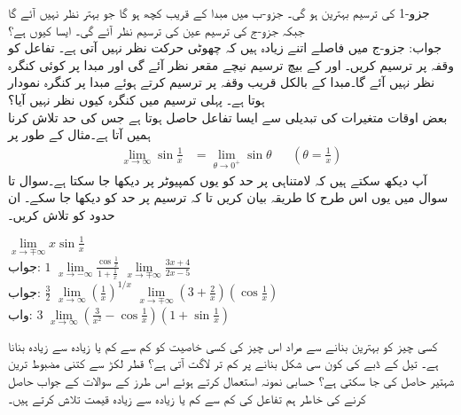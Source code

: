 جزو-1 کی ترسیم بہترین ہو گی۔ جزو-ب میں مبدا کے قریب کچھ ہو گا جو بہتر نظر نہیں آئے گا جبکہ جزو-ج کی ترسیم عین  کی ترسیم نظر آئے گی۔ ایسا کیوں ہے؟\\
جواب:\quad
جزو-ج میں فاصلے اتنے زیادہ ہیں کہ چھوٹی حرکت نظر نہیں آتی ہے۔
تفاعل  کو وقفہ  پر ترسیم کریں۔   اور   کے بیچ ترسیم  نیچے مقعر نظر آئے گی اور مبدا پر کوئی کنگرہ نظر نہیں آئے گا۔مبدا کے بالکل قریب وقفہ پر ترسیم کرتے ہوئے مبدا پر کنگرہ نمودار ہوتا ہے۔ پہلی ترسیم میں کنگرہ کیوں نظر نہیں آیا؟ 
\\
بعض اوقات متغیرات کی تبدیلی سے ایسا تفاعل حاصل ہوتا ہے جس کی حد  تلاش کرنا ہمیں آتا ہے۔مثال کے طور پر 
\begin{align*}
\lim\limits_{x\to\infty}\sin\tfrac{1}{x}&=\lim\limits_{\theta\to0^+}\sin\theta&& (\theta=\tfrac{1}{x})
\end{align*}
آپ دیکھ سکتے ہیں کہ لامتناہی پر حد کو یوں کمپیوٹر پر دیکھا جا سکتا ہے۔سوال  تا سوال  میں یوں اس طرح کا طریقہ بیان کریں تا کہ ترسیم پر حد کو دیکھا جا سکے۔ ان حدود کو تلاش کریں۔

$\lim\limits_{x\to\mp\infty} x\sin\tfrac{1}{x}$\\
جواب:\quad
$1$
$\lim\limits_{x\to-\infty} \tfrac{\cos \tfrac{1}{x}}{1+\tfrac{1}{x}}$
$\lim\limits_{x\to\mp\infty}\tfrac{3x+4}{2x-5}$\\
جواب:\quad
$\tfrac{3}{2}$
$\lim\limits_{x\to\infty} (\tfrac{1}{x})^{1/x}$
$\lim\limits_{x\to\mp\infty} (3+\tfrac{2}{x})(\cos \tfrac{1}{x})$\\
واب:\quad
$3$
$\lim\limits_{x\to\infty} (\tfrac{3}{x^2}-\cos\tfrac{1}{x})(1+\sin\tfrac{1}{x})$

کسی چیز کو بہترین بنانے سے مراد اس چیز کی کسی خاصیت کو کم سے کم یا زیادہ سے زیادہ بنانا ہے۔ تیل کے ڈبے کی کون سی شکل بنانے پر کم تر لاگت آتی ہے؟  قطر لکڑ سے کتنی مضبوط ترین  شہتیر  حاصل کی جا سکتی ہے؟ حسابی نمونہ استعمال کرتے ہوئے اس طرز کے سوالات کے جواب حاصل کرنے کی خاطر ہم تفاعل کی کم سے کم یا زیادہ سے زیادہ قیمت تلاش کرتے ہیں۔

